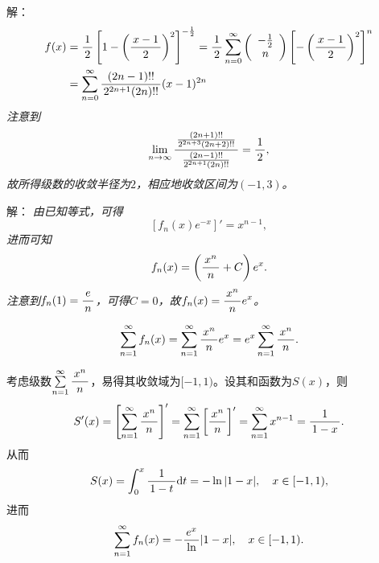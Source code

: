 \begin{frame}
	\linespread{1.5}
	
	\bigskip
	
	\small 解：\it
	\begin{align*}
		f(x)
		&=\df12\left[1-\left(\df{x-1}2\right)^2\right]^{-\frac12}
		=\df12\sumn[0]{\left(\begin{array}{c}
			-\frac12 \\ n
		\end{array}\right)}\left[-\left(\df{x-1}2\right)^2\right]^n\\
		&=\sumn[0]\df{(2n-1)!!}{2^{2n+1}(2n)!!}(x-1)^{2n}
	\end{align*}
	注意到
	$$\limn\df{\frac{(2n+1)!!}{2^{2n+3}(2n+2)!!}}{\frac{(2n-1)!!}{2^{2n+1}(2n)!!}}=\df12,$$
	故所得级数的收敛半径为$2$，相应地收敛区间为$(-1,3)$。
	\fin
\end{frame}

\begin{frame}
	\linespread{1.5}
	
	\bigskip
	
	\small 解：\it
	由已知等式，可得
	$$\left[f_n(x)e^{-x}\right]'=x^{n-1},$$
	进而可知
	$$f_n(x)=\left(\df{x^n}n+C\right)e^x.$$
	注意到$f_n(1)=\df en$，可得$C=0$，故$f_n(x)=\df{x^n}ne^x$。
\end{frame}

\begin{frame}
	\linespread{1.5}
	\small\it
	
	$$\sumn f_n(x)=\sumn\df{x^n}ne^x=e^x\sumn\df{x^n}n.$$
	
	考虑级数$\sumn\df{x^n}n$，易得其收敛域为$[-1,1)$。设其和函数为$S(x)$，则
	$$S'(x)=\left[\sumn\df{x^n}n\right]'
	=\sumn\left[\df{x^n}n\right]'=\sumn x^{n-1}=\df1{1-x}.$$
	从而
	$$S(x)=\dint_0^x\df1{1-t}\d t=-\ln|1-x|,\quad x\in[-1,1),$$
	进而
	$$\sumn f_n(x)=-\df{e^x}\ln|1-x|,\quad x\in[-1,1).$$
	\fin
\end{frame}

